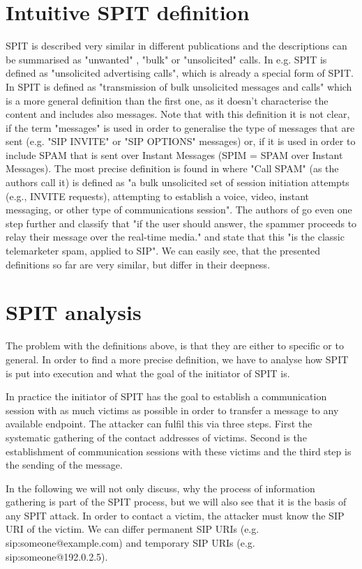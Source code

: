 \documentclass[final
	]{issa}
\begin{document}
\section{Intuitive SPIT definition}
SPIT is described very similar in different publications and the descriptions can be summarised as  "unwanted" , "bulk" or "unsolicited" calls. In \cite{paper:SPITreach} e.g. SPIT is defined as "unsolicited advertising calls", which is already a special form of SPIT. In \cite{paper:SPITieee} SPIT is defined as "transmission of bulk unsolicited messages and calls" which is a more general definition than the first one, as it doesn't characterise the content and includes also messages. Note that with this definition it is not clear, if the term "messages" is used in order to generalise the type of messages that are sent (e.g. "SIP INVITE" or "SIP OPTIONS" messages) or, if it is used in order to include SPAM that is sent over Instant Messages (SPIM = SPAM over Instant Messages). The most precise definition is found in \cite{rfc:5039} where "Call SPAM" (as the authors call it) is defined as "a bulk unsolicited set of session initiation attempts (e.g., INVITE requests), attempting to establish a voice, video, instant messaging, or other type of communications session". The authors of \cite{rfc:5039} go even one step further and classify that "if the user should answer, the spammer proceeds to relay their message over the real-time media." and state that this "is the classic telemarketer spam, applied to SIP". We can easily see, that the presented definitions so far are very similar, but differ in their deepness.
\section{SPIT analysis}
The problem with the definitions above, is that they are either to specific or to general. In order to find a more precise definition, we have to analyse how SPIT is put into execution
and what the goal of the initiator of SPIT is.

In practice the initiator of SPIT has the goal to establish a communication session with as much victims as possible in order to transfer a message to any available endpoint. The attacker can fulfil this via three steps. 
First the systematic gathering of the contact addresses of victims. Second is the establishment of communication sessions with these victims and the third step is the sending of the message.

In the following we will not only discuss, why the process of information gathering is part of the SPIT process, but we will also see that it is the basis of any SPIT attack. In order to contact a victim, the attacker must know the SIP URI of the victim. We can differ permanent SIP URIs (e.g. sip:someone@example.com) and temporary SIP URIs (e.g. sip:someone@192.0.2.5).
\end{document}
